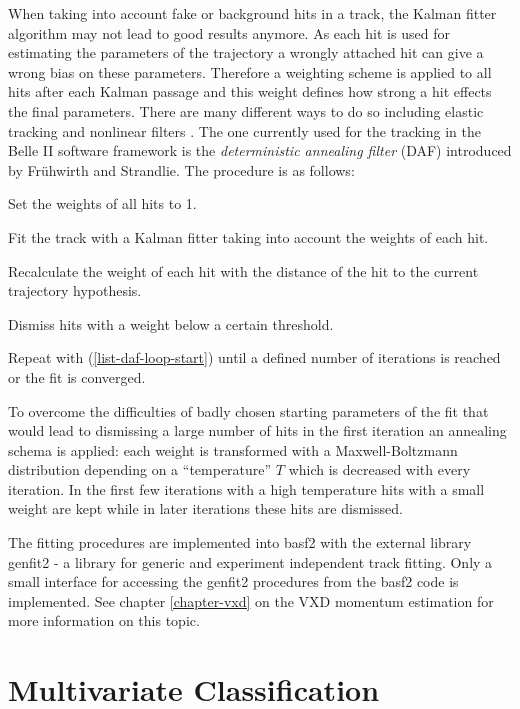 When taking into account fake or background hits in a track, the Kalman fitter algorithm may not lead to good results anymore. As each hit is used for estimating the parameters of the trajectory a wrongly attached hit can give a wrong bias on these parameters. Therefore a weighting scheme is applied to all hits after each Kalman passage and this weight defines how strong a hit effects the final parameters. There are many different ways to do so including elastic tracking and nonlinear filters \cite{daf_fruh}. The one currently used for the tracking in the Belle II software framework is the \emph{deterministic annealing filter} (DAF) introduced by Frühwirth and Strandlie. The procedure is as follows:
\begin{zlist}
  \item Set the weights of all hits to 1.
  \item Fit the track with a Kalman fitter taking into account the weights of each hit. \label{list-daf-loop-start}
  \item Recalculate the weight of each hit with the distance of the hit to the current trajectory hypothesis.
  \item Dismiss hits with a weight below a certain threshold.
  \item Repeat with (\ref{list-daf-loop-start}) until a defined number of iterations is reached or the fit is converged.
\end{zlist}

To overcome the difficulties of badly chosen starting parameters of the fit that would lead to dismissing a large number of hits in the first iteration an annealing schema is applied: each weight is transformed with a Maxwell-Boltzmann distribution depending on a ``temperature'' $T$ which is decreased with every iteration. In the first few iterations with a high temperature hits with a small weight are kept while in later iterations these hits are dismissed.

The fitting procedures are implemented into basf2 with the external library genfit2 \cite{genfit} - a library for generic and experiment independent track fitting. Only a small interface for accessing the genfit2 procedures from the basf2 code is implemented. See chapter \ref{chapter-vxd} on the VXD momentum estimation for more information on this topic.

\section{Multivariate Classification}

